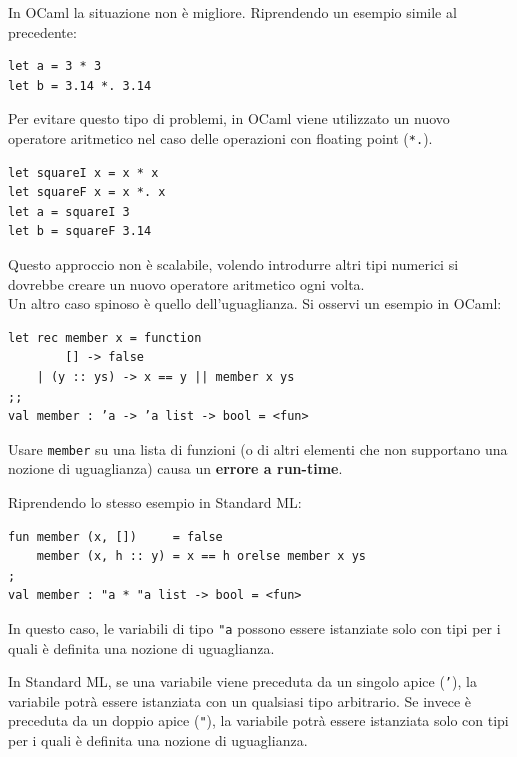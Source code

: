 \documentclass{article}
\begin{document}
In OCaml la situazione non è migliore. Riprendendo un esempio simile al precedente:
\begin{tcolorbox}
\begin{verbatim}
let a = 3 * 3
let b = 3.14 *. 3.14
\end{verbatim}
\end{tcolorbox}
Per evitare questo tipo di problemi, in OCaml viene utilizzato un nuovo operatore aritmetico nel caso delle operazioni con floating point (\texttt{*.}).
\begin{tcolorbox}
\begin{verbatim}
let squareI x = x * x
let squareF x = x *. x
let a = squareI 3
let b = squareF 3.14
\end{verbatim}
\end{tcolorbox}
Questo approccio non è scalabile, volendo introdurre altri tipi numerici si dovrebbe creare un nuovo operatore aritmetico ogni volta.\vspace{8pt}\\
Un altro caso spinoso è quello dell'uguaglianza. Si osservi un esempio in OCaml:
\begin{tcolorbox}
\begin{verbatim}
let rec member x = function
        [] -> false
    | (y :: ys) -> x == y || member x ys
;;
val member : ’a -> ’a list -> bool = <fun>
\end{verbatim}
\end{tcolorbox}
Usare \texttt{member} su una lista di funzioni (o di altri elementi che non supportano una nozione di uguaglianza) causa un \textbf{errore a run-time}.

Riprendendo lo stesso esempio in Standard ML:
\begin{tcolorbox}
\begin{verbatim}
fun member (x, [])     = false
    member (x, h :: y) = x == h orelse member x ys
;
val member : "a * "a list -> bool = <fun>
\end{verbatim}
\end{tcolorbox}
In questo caso, le variabili di tipo \texttt{"a} possono essere istanziate solo con tipi per i quali è definita una nozione di uguaglianza.

In Standard ML, se una variabile viene preceduta da un singolo apice (\texttt{'}), la variabile potrà essere istanziata con un qualsiasi tipo arbitrario. Se invece è preceduta da un doppio apice (\texttt{"}), la variabile potrà essere istanziata solo con tipi per i quali è definita una nozione di uguaglianza.
\end{document}
